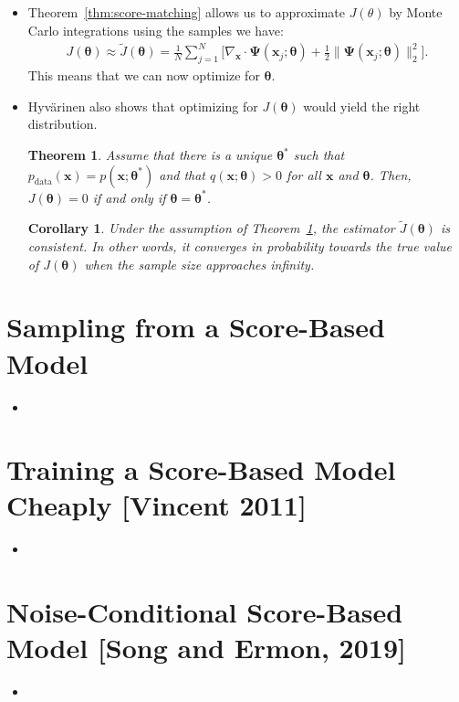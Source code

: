 \documentclass[10pt]{article}
\newtheorem{theorem}[lemma]{Theorem}
\newtheorem{corollary}[lemma]{Corollary}
\newcommand{\ve}[1]{\mathbf{#1}}
\newcommand{\mrm}[1]{\mathrm{#1}}
\newcommand{\ves}[1]{\boldsymbol{#1}}
\begin{document}
\begin{itemize}
  \item Theorem~\ref{thm:score-matching} allows us to approximate $J(\theta)$ by Monte Carlo integrations using the samples we have:
  \begin{align*}
      J(\ves{\theta}) \approx \tilde{J}(\ves{\theta}) 
      = \frac{1}{N} \sum_{j=1}^N \bigg[ \nabla_{\ve{x}} \cdot \ves{\Psi}(\ve{x}_j;\ves{\theta}) + \frac{1}{2} \| \ves{\Psi}(\ve{x}_j;\ves{\theta}) \|_2^2 \bigg].
  \end{align*}
  This means that we can now optimize for $\ves{\theta}$.

  \item Hyv\"{a}rinen also shows that optimizing for $J(\ves{\theta})$ would yield the right distribution.
  
  \begin{theorem} \label{thm:score-matching-uniqueness}
    Assume that there is a unique $\ves{\theta}^*$ such that $p_{\mrm{data}}(\ve{x}) = p(\ve{x};\ves{\theta}^*)$ and that $q(\ve{x};\ves{\theta}) > 0$ for all $\ve{x}$ and $\ves{\theta}$. Then, $J(\ves{\theta}) = 0$ if and only if $\ves{\theta} = \ves{\theta}^*$.
  \end{theorem}

  \begin{corollary}
    Under the assumption of Theorem~\ref{thm:score-matching-uniqueness}, the estimator $\tilde{J}(\ves{\theta})$ is consistent. In other words, it converges in probability towards the true value of $J(\ves{\theta})$ when the sample size approaches infinity.
  \end{corollary}
\end{itemize}

\section{Sampling from a Score-Based Model}

\begin{itemize}
  \item 
\end{itemize}

\section{Training a Score-Based Model Cheaply [Vincent 2011]}

\begin{itemize}
  \item 
\end{itemize}

\section{Noise-Conditional Score-Based Model [Song and Ermon, 2019]}

\begin{itemize}
  \item 
\end{itemize}


  
\end{document}
